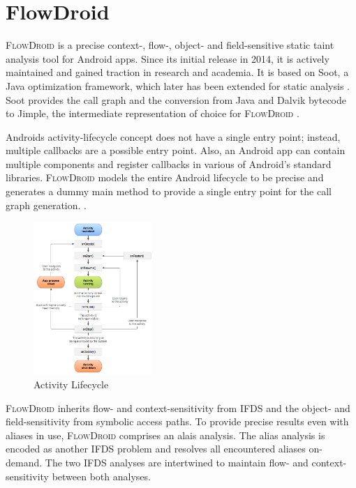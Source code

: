 \documentclass[../draft.tex]{subfiles}
\begin{document}
    \section{FlowDroid}\label{s:flowdroid}
    \textsc{FlowDroid} is a precise context-, flow-, object- and field-sensitive static taint analysis tool for Android apps\cite{Arzt2014}.
    Since its initial release in 2014, it is actively maintained and gained traction in research and academia\footnotemark{}.
    It is based on Soot, a Java optimization framework, which later has been extended for static analysis \cite{Lam2011}.
    Soot provides the call graph and the conversion from Java and Dalvik bytecode to Jimple, the intermediate representation of choice for \textsc{FlowDroid} \cite{Arzt2017PhD}.

    Androids activity-lifecycle concept does not have a single entry point; instead, multiple callbacks are a possible entry point.
    Also, an Android app can contain multiple components and register callbacks in various of Android's standard libraries.
    \textsc{FlowDroid} models the entire Android lifecycle to be precise and generates a dummy main method to provide a single entry point for the call graph generation.
    \cite{Arzt2014}.

    \begin{figure}[tbp]
        \centering
        \includegraphics[width=0.4\textwidth]{figs/activity_lifecycle.png}
        \caption{Activity Lifecycle\protect\footnotemark}
        \label{f:activity}
    \end{figure}

    \textsc{FlowDroid} inherits flow- and context-sensitivity from IFDS and the object- and field-sensitivity from symbolic access paths. To provide precise results even with aliases in use, \textsc{FlowDroid} comprises an alais analysis. The alias analysis is encoded as another IFDS problem and resolves all encountered aliases on-demand. The two IFDS analyses are intertwined to maintain flow- and context-sensitivity between both analyses\cite{Arzt2014}.
\end{document}
